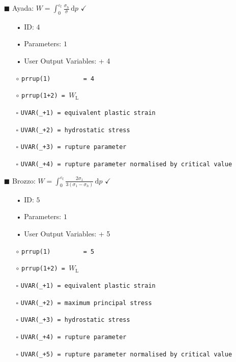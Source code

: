 \documentclass[11pt,a4paper,twoside,final,onecolumn,titlepage]{article}
\newcommand{\verified}{\hspace{0.5pt} {\LARGE $\checkmark$}}
\begin{document}
\pagebreak
\begin{itemize}
	\item[\tiny$\blacksquare$] Ayada: $\displaystyle W =  \int_{0}^{\varepsilon_\textrm{f}}\frac{\sigma_{h}}{\bar{\sigma}}\,\text{d}p$ \verified{}
	\begin{itemize}
		\item[•] ID: $4$
		\item[•] Parameters: $1$
		\item[•] User Output Variables: + 4\\
		\item[$\circ$] \texttt{prrup(1)\,\,\,\,\,\,\,\,\,= 4}
		\item[$\circ$] \texttt{prrup(1+2) = $W_\textrm{L}$}\\
		\item[\tiny$\square$] \texttt{UVAR(\_+1) = equivalent plastic strain}
		\item[\tiny$\square$] \texttt{UVAR(\_+2) = hydrostatic stress}
		\item[\tiny$\square$] \texttt{UVAR(\_+3) = rupture parameter}
		\item[\tiny$\square$] \texttt{UVAR(\_+4) = rupture parameter normalised by critical value}\\
	\end{itemize}
\end{itemize}

\begin{itemize}
	\item[\tiny$\blacksquare$] Brozzo: $\displaystyle W =  \int_{0}^{\varepsilon_\textrm{f}}\frac{2\sigma_{1}}{3\left(\sigma_{1}-\sigma_{h}\right)}\,\text{d}p$ \verified{}
	\begin{itemize}
		\item[•] ID: $5$
		\item[•] Parameters: $1$
		\item[•] User Output Variables: + 5\\
		\item[$\circ$] \texttt{prrup(1)\,\,\,\,\,\,\,\,\,= 5}
		\item[$\circ$] \texttt{prrup(1+2) = $W_\textrm{L}$}\\
		\item[\tiny$\square$] \texttt{UVAR(\_+1) = equivalent plastic strain}
		\item[\tiny$\square$] \texttt{UVAR(\_+2) = maximum principal stress}
		\item[\tiny$\square$] \texttt{UVAR(\_+3) = hydrostatic stress}
		\item[\tiny$\square$] \texttt{UVAR(\_+4) = rupture parameter}
		\item[\tiny$\square$] \texttt{UVAR(\_+5) = rupture parameter normalised by critical value}\\
	\end{itemize}
\end{itemize}
\end{document}
